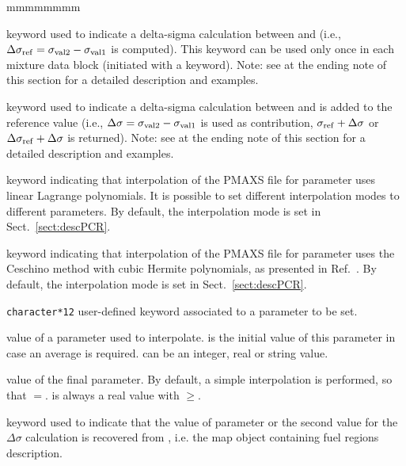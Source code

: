 \begin{ListeDeDescription}{mmmmmmmm}
\item[\moc{DELTA}] keyword used to indicate a delta-sigma calculation between  and 
(i.e., $\Delta\sigma_{\rm ref}=\sigma_{\rm val2}-\sigma_{\rm val1}$ is computed). This keyword can be used only once in each mixture data block (initiated
with a  keyword).  Note: see at the ending note of this section for a detailed description and examples.

\item[\moc{ADD}] keyword used to indicate a delta-sigma calculation between  and  is added to the reference value
(i.e., $\Delta\sigma=\sigma_{\rm val2}-\sigma_{\rm val1}$ is used as contribution, $\sigma_{\rm ref}+\Delta\sigma$ or $\Delta\sigma_{\rm ref}+\Delta\sigma$ is returned). Note: see at the ending note of this section for a detailed description and examples.

\item[\moc{LINEAR}] keyword indicating that interpolation of the PMAXS file for parameter  uses linear Lagrange
polynomials. It is possible to set different interpolation modes to different parameters. By default, the interpolation mode is set in Sect.~\ref{sect:descPCR}.

\item[\moc{CUBIC}] keyword indicating that interpolation of the PMAXS file for parameter  uses the Ceschino method
with cubic Hermite polynomials, as presented in Ref.~\cite{Intech2011}. By default, the interpolation mode is set in Sect.~\ref{sect:descPCR}.

\item[\dusa{PARKEY}] {\tt character*12} user-defined keyword associated to a parameter to be set.

\item[\dusa{val1}] value of a parameter used to interpolate.   is the initial value of this parameter in case an average is required.  can be an integer, real or string value.

\item[\dusa{val2}] value of the final parameter. By default, a simple interpolation is performed, so that $=$.  is always a real value with $\ge$.

\item[\moc{MAP}] keyword used to indicate that the value of parameter  or the second value for the $\Delta\sigma$ calculation is
recovered from , i.e. the {\sc map} object containing fuel regions description.


\end{ListeDeDescription}
